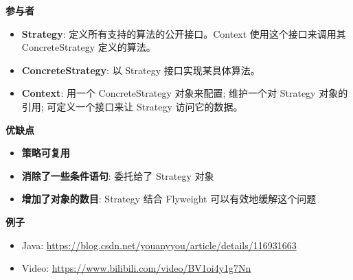 \noindent\textbf{参与者}

\begin{itemize}
    \item \textbf{Strategy}: 定义所有支持的算法的公开接口。Context 使用这个接口来调用其 ConcreteStrategy 定义的算法。
    \item \textbf{ConcreteStrategy}: 以 Strategy 接口实现某具体算法。
    \item \textbf{Context}: 用一个 ConcreteStrategy 对象来配置; 维护一个对 Strategy 对象的引用; 可定义一个接口来让 Strategy 访问它的数据。
\end{itemize}

\noindent\textbf{优缺点}

\begin{itemize}
    \item \textbf{策略可复用}
    \item \textbf{消除了一些条件语句}: 委托给了 Strategy 对象
    \item \textbf{增加了对象的数目}: Strategy 结合 Flyweight 可以有效地缓解这个问题
\end{itemize}

\noindent\textbf{例子}

\begin{itemize}
    \item Java: \url{https://blog.csdn.net/youanyyou/article/details/116931663}
    \item Video: \url{https://www.bilibili.com/video/BV1oi4y1g7Nn}
\end{itemize}



\newpage